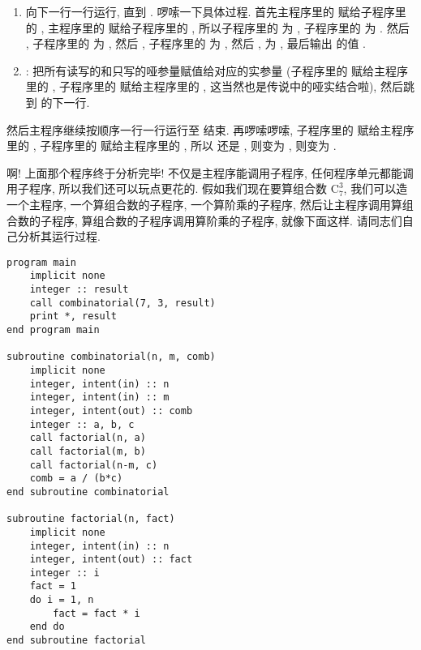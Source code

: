 \begin{enumerate}
\begin{enumerate}
        \item 向下一行一行运行, 直到 . 啰嗦一下具体过程. 首先主程序里的  赋给子程序里的 , 主程序里的  赋给子程序里的 , 所以子程序里的  为 , 子程序里的  为 . 然后 , 子程序里的  为 , 然后 , 子程序里的  为 , 然后 ,  为 , 最后输出  的值 . 
        \item {}: 把所有读写的和只写的哑参量赋值给对应的实参量 (子程序里的  赋给主程序里的 , 子程序里的  赋给主程序里的 , 这当然也是传说中的哑实结合啦), 然后跳到  的下一行. 
    \end{enumerate} 然后主程序继续按顺序一行一行运行至  结束. 再啰嗦啰嗦, 子程序里的  赋给主程序里的 , 子程序里的  赋给主程序里的 , 所以  还是 ,  则变为 ,  则变为 . 
\end{enumerate} 

啊! 上面那个程序终于分析完毕! 不仅是主程序能调用子程序, 任何程序单元都能调用子程序, 所以我们还可以玩点更花的. 假如我们现在要算组合数 $ \text{C} _7^3 $, 我们可以造一个主程序, 一个算组合数的子程序, 一个算阶乘的子程序, 然后让主程序调用算组合数的子程序, 算组合数的子程序调用算阶乘的子程序, 就像下面这样. 请同志们自己分析其运行过程. \label{fact_comb} 
\begin{lstlisting} 
program main
    implicit none
    integer :: result
    call combinatorial(7, 3, result)
    print *, result
end program main

subroutine combinatorial(n, m, comb)
    implicit none
    integer, intent(in) :: n
    integer, intent(in) :: m
    integer, intent(out) :: comb
    integer :: a, b, c
    call factorial(n, a)
    call factorial(m, b)
    call factorial(n-m, c)
    comb = a / (b*c)
end subroutine combinatorial

subroutine factorial(n, fact)
    implicit none
    integer, intent(in) :: n
    integer, intent(out) :: fact
    integer :: i
    fact = 1
    do i = 1, n
        fact = fact * i
    end do
end subroutine factorial
\end{lstlisting} 

